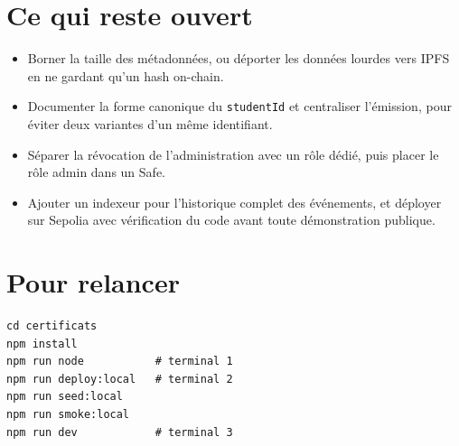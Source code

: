 \documentclass[11pt,a4paper,parskip=half]{scrartcl}
\begin{document}
\section{Ce qui reste ouvert}

\begin{itemize}
\item Borner la taille des métadonnées, ou déporter les données lourdes vers IPFS
  en ne gardant qu'un hash on-chain.
\item Documenter la forme canonique du \texttt{studentId} et centraliser
  l'émission, pour éviter deux variantes d'un même identifiant.
\item Séparer la révocation de l'administration avec un rôle dédié, puis placer
  le rôle admin dans un Safe.
\item Ajouter un indexeur pour l'historique complet des événements, et déployer
  sur Sepolia avec vérification du code avant toute démonstration publique.
\end{itemize}

\section{Pour relancer}

\begin{lstlisting}[basicstyle=\ttfamily\small]
cd certificats
npm install
npm run node           # terminal 1
npm run deploy:local   # terminal 2
npm run seed:local
npm run smoke:local
npm run dev            # terminal 3
\end{lstlisting}
\end{document}
